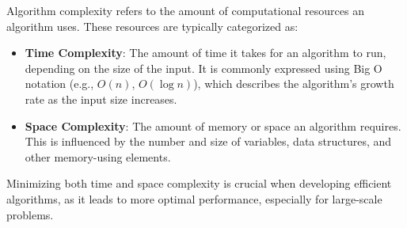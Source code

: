 \begin{tcolorbox}[title=Algorithm Complexity]
Algorithm complexity refers to the amount of computational resources an algorithm uses. These resources are typically categorized as:

\begin{itemize}
    \item \textbf{Time Complexity}: The amount of time it takes for an algorithm to run, depending on the size of the input.
    It is commonly expressed using Big O notation (e.g., \(O(n)\), \(O(\log n)\)), which describes the algorithm's growth rate
    as the input size increases.
    
    \item \textbf{Space Complexity}: The amount of memory or space an algorithm requires. This is influenced by the number and 
    size of variables, data structures, and other memory-using elements.
\end{itemize}

Minimizing both time and space complexity is crucial when developing efficient algorithms, as it leads to more optimal performance, especially for large-scale problems.
\end{tcolorbox}

